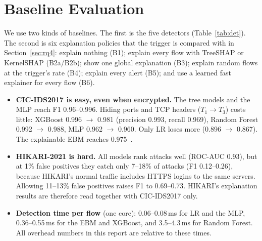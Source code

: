 \section{Baseline Evaluation}
\label{sec:baselines}
We use two kinds of baselines. The first is the five detectors (Table~\ref{tab:det}). The second is six explanation policies that the trigger is compared with in Section~\ref{sec:rq4}: explain nothing (B1); explain every flow with TreeSHAP or KernelSHAP (B2a/B2b); show one global explanation (B3); explain random flows at the trigger's rate (B4); explain every alert (B5); and use a learned fast explainer for every flow (B6).



\begin{itemize}[leftmargin=*, itemsep=0pt]
  \item \textbf{CIC-IDS2017 is easy, even when encrypted.} The tree models and the MLP reach F1 0.96--0.996. Hiding ports and TCP headers ($T_1 \rightarrow T_3$) costs little: XGBoost 0.996 $\rightarrow$ 0.981 (precision 0.993, recall 0.969), Random Forest 0.992 $\rightarrow$ 0.988, MLP 0.962 $\rightarrow$ 0.960. Only LR loses more (0.896 $\rightarrow$ 0.867). The explainable EBM reaches 0.975~\cite{rudin2019}.
  \item \textbf{HIKARI-2021 is hard.} All models rank attacks well (ROC-AUC 0.93), but at 1\% false positives they catch only 7--18\% of attacks (F1 0.12--0.26), because HIKARI's normal traffic includes HTTPS logins to the same servers. Allowing 11--13\% false positives raises F1 to 0.69--0.73. HIKARI's explanation results are therefore read together with CIC-IDS2017 only.
  \item \textbf{Detection time per flow} (one core): 0.06--0.08\,ms for LR and the MLP, 0.36--0.55\,ms for the EBM and XGBoost, and 3.5--4.3\,ms for Random Forest. All overhead numbers in this report are relative to these times.
\end{itemize}
